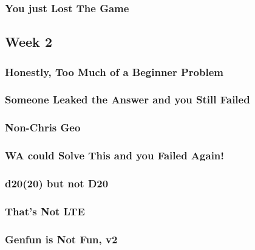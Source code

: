 \documentclass[titlepage=true]{scrartcl}
\begin{document}
    \subsubsection{You just Lost The Game}
	\label{16.1.7}
	
	\newpage
    
    \subsection{Week 2}
    
    \subsubsection{Honestly, Too Much of a Beginner Problem}
	\label{16.2.1}
	
	\newpage

	\subsubsection{Someone Leaked the Answer and you Still Failed}
	\label{16.2.2}
	
	\newpage

    \subsubsection{Non-Chris Geo}
	\label{16.2.3}
	
	\newpage

    \subsubsection{WA could Solve This and you Failed Again!}
	\label{16.2.4}
	
	\newpage

    \subsubsection{d20(20) but not D20}
	\label{16.2.5}
	
	\newpage

    \subsubsection{That's Not LTE}
	\label{16.2.6}
	
	\newpage

	\subsubsection{Genfun is Not Fun, v2}
	\label{16.2.7}
	
	\newpage
\end{document}
